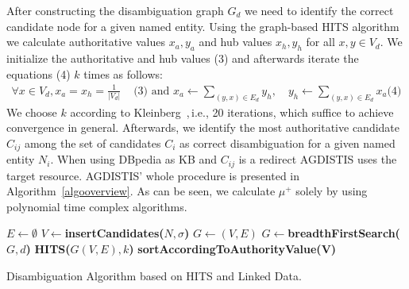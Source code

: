 After constructing the disambiguation graph $G_d$ we need to identify the correct candidate node for a given named entity.
Using the graph-based  \ac{HITS} algorithm we calculate authoritative values $x_a,y_a$ and hub values $x_h,y_h$ for all $x,y\in V_d$.
We initialize the authoritative and hub values (3) and afterwards iterate the equations (4) $k$ times as follows: 
\begin{align*}
\forall x \in V_d, x_a=x_h=\frac{1}{|V_d|} &\text{ (3) and } 
x_a\longleftarrow  \sum_{(y,x)\in E_d} y_h, \quad
y_h\longleftarrow \sum_{(y,x)\in E_d} x_a \text{(4)}
\end{align*}
We choose $k$ according to Kleinberg~\cite{HITS},\,i.e., 20 iterations, which suffice to achieve convergence in general. %
Afterwards, we identify the most authoritative candidate $C_{ij}$ among the set of candidates $C_i$ as correct disambiguation for a given named entity $N_i$. %
When using DBpedia as \ac{KB} and $C_{ij}$ is a redirect AGDISTIS uses the target resource. %
AGDISTIS' whole procedure is presented in Algorithm~\ref{algooverview}.
As can be seen, we calculate $\mu^{+}$ solely by using polynomial time complex algorithms.
\begin{algorithm}
$E \longleftarrow \emptyset$\;
$V \longleftarrow${\bf insertCandidates($N, \sigma$)}\;
$G \longleftarrow (V,E)$\;
$G \longleftarrow${\bf breadthFirstSearch($G,d$)}\;
{\bf  HITS($G(V,E), k$)}\;
{\bf sortAccordingToAuthorityValue(V)}\;
 {
}
\caption{Disambiguation Algorithm based on \ac{HITS} and Linked Data.}
\label{algooverview}
\end{algorithm}



